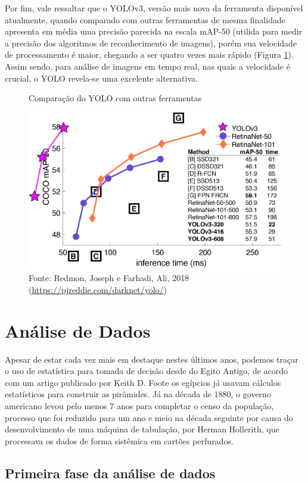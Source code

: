 \par Por fim, vale ressaltar que o YOLOv3, versão mais nova da ferramenta disponível atualmente, quando comparado com outras ferramentas de mesma finalidade apresenta em média uma precisão parecida na escala mAP-50 (utilida para medir a precisão dos algoritmos de reconhecimento de imagens), porém sua velocidade de processamento é maior, chegando a ser quatro vezes mais rápido (Figura \ref{speedyolo}). Assim sendo, para análise de imagens em tempo real, nas quais a velocidade é crucial, o YOLO revela-se uma excelente alternativa.

\begin{figure}[H]
    \centering
    \caption{Comparação do YOLO com outras ferramentas}
    \includegraphics[width=0.6\linewidth]{Imagens/yolo-speed.jpg}
    \caption*{Fonte: Redmon, Joseph e Farhadi, Ali, 2018 (\url{https://pjreddie.com/darknet/yolo/})}
    \label{speedyolo}
\end{figure}

\section{Análise de Dados}

\indent
\par Apesar de estar cada vez mais em destaque nestes últimos anos, podemos traçar o uso de estatística para tomada de decisão desde do Egito Antigo, de acordo com um artigo publicado por Keith D. Foote \cite{Foote2018} os egípcios já usavam cálculos estatísticos para construir as pirâmides. Já na década de 1880, o governo americano levou pelo menos 7 anos para completar o censo da população, processo que foi reduzido para um ano e meio na década seguinte por causa do desenvolvimento de uma máquina de tabulação, por Herman Hollerith, que processava os dados de forma sistêmica em cartões perfurados.

\subsection{Primeira fase da análise de dados}

